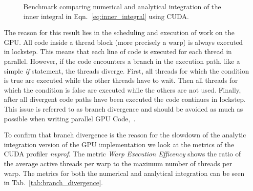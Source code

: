 \begin{figure}[!htbp]
  \centering
  \caption[Benchmark computing inner integral on GPU.]{Benchmark comparing numerical and analytical integration of the inner integral in Eqn.~\eqref{eq:inner_integral} using CUDA.}
  \label{fig:cuda_num_vs_anal}
\end{figure}

The reason for this result lies in the scheduling and execution of work on the GPU. All code inside a thread block (more precisely a warp) is always executed in lockstep. This means that each line of code is executed for each thread in parallel. However, if the code encounters a branch in the execution path, like a simple \emph{if} statement, the threads diverge. First, all threads for which the condition is true are executed while the other threads have to wait. Then all threads for which the condition is false are executed while the others are not used. Finally, after all divergent code paths have been executed the code continues in lockstep. This issue is referred to as branch divergence and should be avoided as much as possible when writing parallel GPU Code,~\cite{CudaBestPracticeGuide}.

To confirm that branch divergence is the reason for the slowdown of the analytic integration version of the GPU implementation we look at the metrics of the CUDA profiler \emph{nvprof}. The metric \emph{Warp Execution Efficency} shows the ratio of the average active threads per warp to the maximum number of threads per warp. The metrics for both the numerical and analytical integration can be seen in Tab.~\ref{tab:branch_divergence}.

